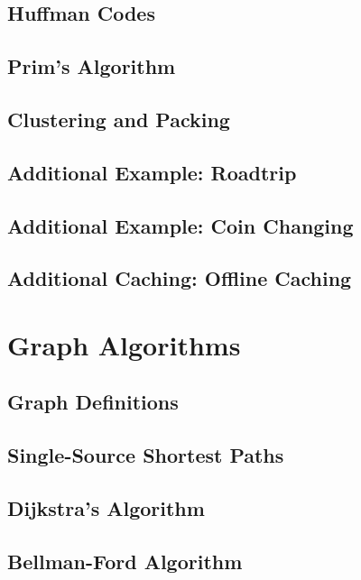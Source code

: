 \documentclass[11pt]{article}
\theoremstyle{plain}
\theoremstyle{definition}
\numberwithin{equation}{section}
\numberwithin{figure}{section}
\begin{document}
\subsection{Huffman Codes}

\subsection{Prim's Algorithm}

\subsection{Clustering and Packing}

\subsection{Additional Example: Roadtrip}

\subsection{Additional Example: Coin Changing}

\subsection{Additional Caching: Offline Caching}

\newpage
\section{Graph Algorithms}

\subsection{Graph Definitions}

\subsection{Single-Source Shortest Paths}

\subsection{Dijkstra's Algorithm}

\subsection{Bellman-Ford Algorithm}
\end{document}
